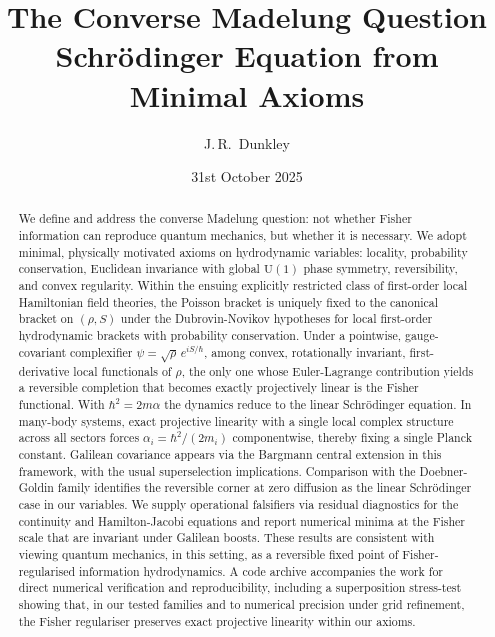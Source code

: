 \documentclass[11pt,a4paper]{article}
\title{\textbf{The Converse Madelung Question} \\
\smallskip
\large{Schrödinger Equation from Minimal Axioms}}
\author{J.\,R.~Dunkley}
\date{31st October 2025}
\numberwithin{equation}{section}
\theoremstyle{thmcompact}
\theoremstyle{remark}
\begin{document}
\maketitle
	
\begin{abstract}
	We define and address the converse Madelung question: not whether Fisher information can reproduce quantum mechanics, but whether it is necessary. We adopt minimal, physically motivated axioms on hydrodynamic variables: locality, probability conservation, Euclidean invariance with global $\mathrm{U}(1)$ phase symmetry, reversibility, and convex regularity. Within the ensuing explicitly restricted class of first-order local Hamiltonian field theories, the Poisson bracket is uniquely fixed to the canonical bracket on $(\rho,S)$ under the Dubrovin-Novikov hypotheses for local first-order hydrodynamic brackets with probability conservation. Under a pointwise, gauge-covariant complexifier $\psi=\sqrt{\rho}\,e^{iS/\hbar}$, among convex, rotationally invariant, first-derivative local functionals of $\rho$, the only one whose Euler-Lagrange contribution yields a reversible completion that 
	becomes exactly projectively linear is the Fisher functional. With $\hbar^{2}=2m\alpha$ the dynamics reduce to the linear Schrödinger equation. In many-body systems, exact projective linearity with a single local complex structure across all sectors forces $\alpha_i=\hbar^{2}/(2m_i)$ componentwise, thereby fixing a single Planck constant. Galilean covariance appears via the Bargmann central extension in this framework, with the usual superselection implications. Comparison with the Doebner-Goldin family identifies the reversible corner at zero diffusion as the linear Schrödinger case in our variables. We supply operational falsifiers via residual diagnostics for the continuity and Hamilton-Jacobi equations and report numerical minima at the Fisher scale that are invariant under Galilean boosts. These results are consistent with viewing quantum mechanics, in this setting, as a reversible fixed point of Fisher-regularised information hydrodynamics. A code archive accompanies the work for direct numerical verification and reproducibility, including a superposition stress-test showing that, in our tested families and to numerical precision under grid refinement, the Fisher regulariser preserves exact projective linearity within our axioms.
\end{abstract}


\newpage
\tableofcontents
\newpage
\end{document}
